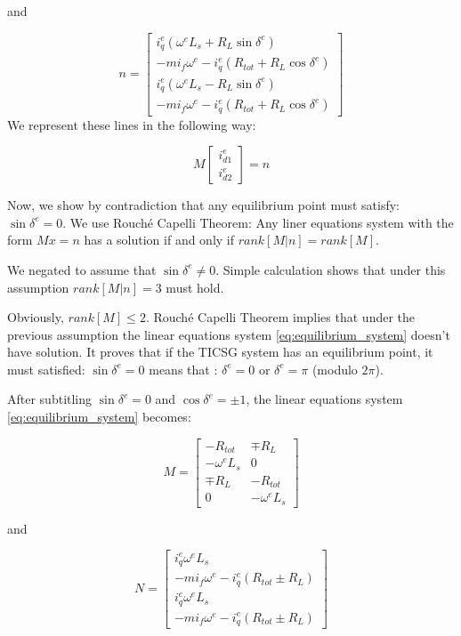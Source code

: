 \documentclass[conference]{IEEEtran}
\begin{document}
and 

\[
n=\left[\begin{array}{c}
i_{q}^{e}\left(\omega^{e}L_{s}+R_{L}\sin\delta^{e}\right)\\
-mi_{f}\omega^{e}-i_{q}^{e}\left(R_{tot}+R_{L}\cos\delta^{e}\right)\\
i_{q}^{e}\left(\omega^{e}L_{s}-R_{L}\sin\delta^{e}\right)\\
-mi_{f}\omega^{e}-i_{q}^{e}\left(R_{tot}+R_{L}\cos\delta^{e}\right)
\end{array}\right]
\]
We represent these lines in the following way:

\begin{equation}
M\left[\begin{array}{c}
i_{d1}^{e}\\
i_{d2}^{e}
\end{array}\right]=n\label{eq:equilibrium_system}
\end{equation}

Now, we  show by contradiction that any equilibrium point must satisfy: $\sin\delta^e=0$.
We use Rouch\'e Capelli Theorem:  Any liner equations system with the form  $Mx=n$ has a  solution if and only if $rank\left[M|n\right]=rank\left[M\right].$

We negated to assume that $\sin\delta^{e}\ne0$. Simple calculation shows that under this assumption   $rank\left[M|n\right]=3$ must hold.

Obviously, $rank\left[M\right]\le2$.  Rouch\'e Capelli Theorem implies that under the
previous assumption the linear equations system \eqref{eq:equilibrium_system} doesn't have solution. It proves that  if the TICSG system has an equilibrium point, it must satisfied: $\sin\delta^{e}=0$ means that : $\delta^{e}=0$ or $\delta^e = \pi$ (modulo $2\pi$).

After subtitling $\sin\delta^{e}=0$
and $\cos\delta^{e}=\pm 1$, the linear equations system  \eqref{eq:equilibrium_system} becomes:

$$
M=\left[\begin{array}{cc}
-R_{tot} & \mp R_{L}\\
-\omega^{e}L_{s} & 0\\
  \mp R_{L} & -R_{tot}\\
0 & -\omega^{e}L_{s}
\end{array}\right]
$$

and 

$$
N=\left[\begin{array}{c}
i_{q}^{e}\omega^{e}L_{s}\\
-mi_{f}\omega^{e}-i_{q}^{e}\left(R_{tot} \pm R_{L}\right)\\
i_{q}^{e}\omega^{e}L_{s}\\
-mi_{f}\omega^{e}-i_{q}^{e}\left(R_{tot} \pm R_{L}\right)
\end{array}\right]
$$
\end{document}
